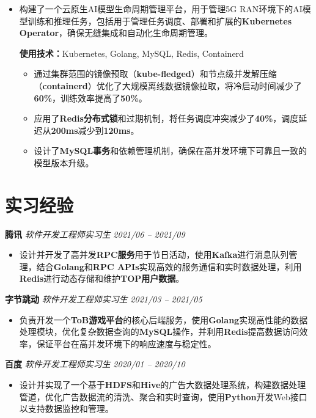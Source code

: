 \documentclass[a4paper,10pt]{article}
\begin{document}
\begin{CJK}{UTF8}{gbsn}
\begin{itemize}[leftmargin=*,noitemsep]
    \item 构建了一个云原生AI模型生命周期管理平台，用于管理5G RAN环境下的AI模型训练和推理任务，包括用于管理任务调度、部署和扩展的\textbf{Kubernetes Operator}，确保无缝集成和自动化生命周期管理。

    \textbf{使用技术：}Kubernetes, Golang, MySQL, Redis, Containerd
    \begin{itemize}[noitemsep]
        \item 通过集群范围的镜像预取（\textbf{kube-fledged}）和节点级并发解压缩（\textbf{containerd}）优化了大规模离线数据镜像拉取，将冷启动时间减少了\textbf{60\%}，训练效率提高了\textbf{50\%}。
        \item 应用了\textbf{Redis分布式锁}和过期机制，将任务调度冲突减少了\textbf{40\%}，调度延迟从\textbf{200ms}减少到\textbf{120ms}。
        \item 设计了\textbf{MySQL事务}和依赖管理机制，确保在高并发环境下可靠且一致的模型版本升级。
    \end{itemize}

\end{itemize}

\section*{实习经验}

\noindent\textbf{腾讯} \hfill \textit{软件开发工程师实习生} \hfill \textit{2021/06 -- 2021/09}\vspace{-0.5em}
\begin{itemize}[leftmargin=*,noitemsep]
    \item 设计并开发了高并发\textbf{RPC服务}用于节日活动，使用\textbf{Kafka}进行消息队列管理，结合\textbf{Golang}和\textbf{RPC APIs}实现高效的服务通信和实时数据处理，利用\textbf{Redis}进行动态存储和维护\textbf{TOP用户数据}。
\end{itemize}

\noindent\textbf{字节跳动} \hfill \textit{软件开发工程师实习生} \hfill \textit{2021/03 -- 2021/05}\vspace{-0.5em}
\begin{itemize}[leftmargin=*,noitemsep]
    \item 负责开发一个\textbf{ToB游戏平台}的核心后端服务，使用\textbf{Golang}实现高性能的数据处理模块，优化复杂数据查询的\textbf{MySQL}操作，并利用\textbf{Redis}提高数据访问效率，保证平台在高并发环境下的响应速度与稳定性。
\end{itemize}

\noindent\textbf{百度} \hfill \textit{软件开发工程师实习生} \hfill \textit{2020/01 -- 2020/10}\vspace{-0.5em}
\begin{itemize}[leftmargin=*,noitemsep]
    \item 设计并实现了一个基于\textbf{HDFS}和\textbf{Hive}的广告大数据处理系统，构建数据处理管道，优化广告数据流的清洗、聚合和实时查询，使用\textbf{Python}开发Web接口以支持数据监控和管理。
\end{itemize}


\end{CJK}
\end{document}
